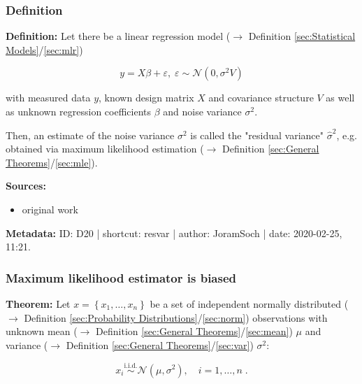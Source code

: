 \documentclass[a4paper,12pt,twoside]{book}
\begin{document}
\subsubsection[\textit{Definition}]{Definition} \label{sec:resvar}
\setcounter{equation}{0}

\textbf{Definition:} Let there be a linear regression model ($\rightarrow$ Definition \ref{sec:Statistical Models}/\ref{sec:mlr})

\begin{equation} \label{eq:resvar-mlr}
y = X\beta + \varepsilon, \; \varepsilon \sim \mathcal{N}(0, \sigma^2 V)
\end{equation}

with measured data $y$, known design matrix $X$ and covariance structure $V$ as well as unknown regression coefficients $\beta$ and noise variance $\sigma^2$.

Then, an estimate of the noise variance $\sigma^2$ is called the "residual variance" $\hat{\sigma}^2$, e.g. obtained via maximum likelihood estimation ($\rightarrow$ Definition \ref{sec:General Theorems}/\ref{sec:mle}).


\vspace{1em}
\textbf{Sources:}
\begin{itemize}
\item original work\end{itemize}


\vspace{1em}
\textbf{Metadata:} ID: D20 | shortcut: resvar | author: JoramSoch | date: 2020-02-25, 11:21.
\vspace{1em}



\subsubsection[\textbf{Maximum likelihood estimator is biased}]{Maximum likelihood estimator is biased} \label{sec:resvar-bias}
\setcounter{equation}{0}

\textbf{Theorem:} Let $x = \left\lbrace x_1, \ldots, x_n \right\rbrace$ be a set of independent normally distributed ($\rightarrow$ Definition \ref{sec:Probability Distributions}/\ref{sec:norm}) observations with unknown mean ($\rightarrow$ Definition \ref{sec:General Theorems}/\ref{sec:mean}) $\mu$ and variance ($\rightarrow$ Definition \ref{sec:General Theorems}/\ref{sec:var}) $\sigma^2$:

\begin{equation} \label{eq:resvar-bias-ug}
x_i \overset{\text{i.i.d.}}{\sim} \mathcal{N}(\mu, \sigma^2), \quad i = 1,\ldots,n \; .
\end{equation}
\end{document}
